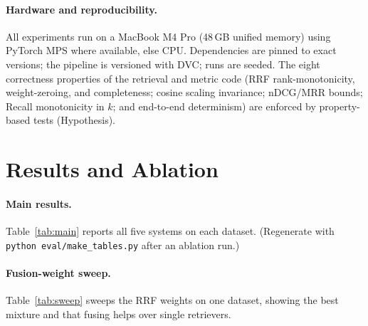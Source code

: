 \documentclass[11pt]{article}
\begin{document}
\paragraph{Hardware and reproducibility.} All experiments run on a MacBook M4 Pro
(48\,GB unified memory) using PyTorch MPS where available, else CPU. Dependencies
are pinned to exact versions; the pipeline is versioned with DVC; runs are seeded.
The eight correctness properties of the retrieval and metric code (RRF
rank-monotonicity, weight-zeroing, and completeness; cosine scaling invariance;
nDCG/MRR bounds; Recall monotonicity in $k$; and end-to-end determinism) are
enforced by property-based tests (Hypothesis).

\section{Results and Ablation}
\label{sec:results}

\paragraph{Main results.} Table~\ref{tab:main} reports all five systems on each
dataset. (Regenerate with \texttt{python eval/make\_tables.py} after an ablation
run.)

\begin{table}[h]
  \centering
  \caption{Main retrieval metrics per system per dataset.}
  \label{tab:main}
\end{table}

\paragraph{Fusion-weight sweep.} Table~\ref{tab:sweep} sweeps the RRF weights on
one dataset, showing the best mixture and that fusing helps over single
retrievers.

\begin{table}[h]
  \centering
  \caption{Fusion-weight sweep over $(w_{bm25}, w_{dense}, w_{splade})$.}
  \label{tab:sweep}
\end{table}
\end{document}
